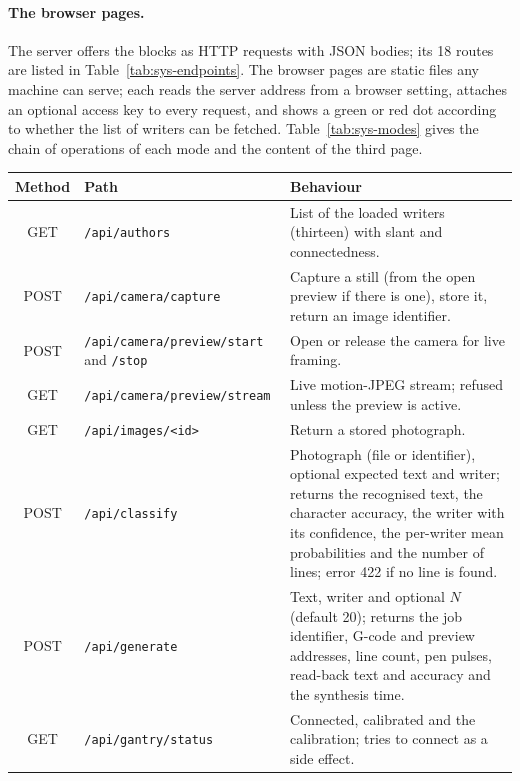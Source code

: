 \paragraph{The browser pages.}
The server offers the blocks as HTTP requests with JSON bodies; its 18 routes are listed in Table~\ref{tab:sys-endpoints}.
The browser pages are static files any machine can serve; each reads the server address from a browser setting, attaches an optional access key to every request, and shows a green or red dot according to whether the list of writers can be fetched.
Table~\ref{tab:sys-modes} gives the chain of operations of each mode and the content of the third page.

\begin{table}[!htbp]
\centering
\fontsize{9}{11}\selectfont
\begin{tabularx}{\linewidth}{|c|p{4.0cm}|X|}
\hline
\textbf{Method} & \textbf{Path} & \textbf{Behaviour} \\
\hline
GET & \texttt{/\allowbreak api/\allowbreak authors} & List of the loaded writers (thirteen) with slant and connectedness. \\
\hline
POST & \texttt{/\allowbreak api/\allowbreak camera/\allowbreak capture} & Capture a still (from the open preview if there is one), store it, return an image identifier. \\
\hline
POST & \texttt{/\allowbreak api/\allowbreak camera/\allowbreak preview/\allowbreak start} and \texttt{/stop} & Open or release the camera for live framing. \\
\hline
GET & \texttt{/\allowbreak api/\allowbreak camera/\allowbreak preview/\allowbreak stream} & Live motion-JPEG stream; refused unless the preview is active. \\
\hline
GET & \texttt{/\allowbreak api/\allowbreak images/\allowbreak <id>} & Return a stored photograph. \\
\hline
POST & \texttt{/\allowbreak api/\allowbreak classify} & Photograph (file or identifier), optional expected text and writer; returns the recognised text, the character accuracy, the writer with its confidence, the per-writer mean probabilities and the number of lines; error 422 if no line is found. \\
\hline
POST & \texttt{/\allowbreak api/\allowbreak generate} & Text, writer and optional $N$ (default 20); returns the job identifier, G-code and preview addresses, line count, pen pulses, read-back text and accuracy and the synthesis time. \\
\hline
GET & \texttt{/\allowbreak api/\allowbreak gantry/\allowbreak status} & Connected, calibrated and the calibration; tries to connect as a side effect. \\

\end{tabularx}
\end{table}
